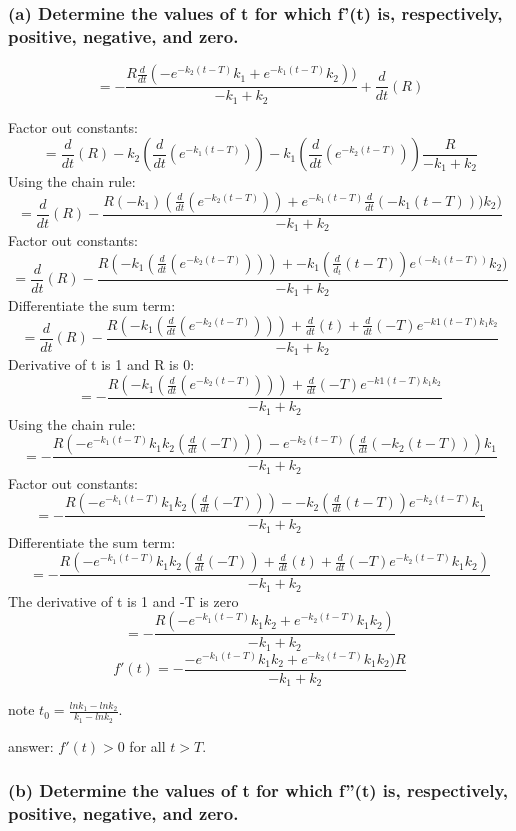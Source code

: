 \documentclass[]{article}
\begin{document}
\subsubsection{(a) Determine the values of t for which f'(t) is,
respectively, positive, negative, and
zero.}\label{a-determine-the-values-of-t-for-which-ft-is-respectively-positive-negative-and-zero.}

\[=- \frac{R \frac{d}{dt}(-e^{-k_2 (t-T)}k_1 + e^{-k_1(t - T)}k_2))}{-k_1 + k_2} + \frac{d}{dt}(R)\]

Factor out constants:
\[=\frac{d}{dt}(R) - k_2(\frac{d}{dt}(e^{-k_1(t - T)})) - k_1 (\frac{d}{dt}(e^{-k_2(t-T)})) \frac{R}{-k_1 + k_2}\]
Using the chain rule:
\[=\frac{d}{dt}(R)-\frac{R(-k_1)(\frac{d}{dt}(e^{-k_2(t-T)})) + e^{-k_1(t-T)}\frac{d}{dt}(-k_1(t-T)))k_2)}{-k_1+ k_2}\]
Factor out constants:
\[=\frac{d}{dt}(R) - \frac{R(-k_1(\frac{d}{dt}(e^{-k_2(t-T)})))+-k_1(\frac{d}{d_t}(t-T))e^(-k_1(t-T))k_2)}{-k_1 + k_2}\]
Differentiate the sum term:
\[=\frac{d}{dt}(R) - \frac{R(-k_1(\frac{d}{dt}(e^{-k_2(t-T)})))+ \frac{d}{dt}(t) + \frac{d}{dt}(-T)e^{-k1(t-T)k_1 k_2}}{-k_1 + k_2}\]
Derivative of t is 1 and R is 0:
\[=- \frac{R(-k_1(\frac{d}{dt}(e^{-k_2(t-T)})))+ \frac{d}{dt}(-T)e^{-k1(t-T)k_1 k_2}}{-k_1 + k_2}\]
Using the chain rule:
\[=-\frac{R(-e^{-k_1 (t-T)}k_1 k_2(\frac{d}{dt}(-T)))- e^{-k_2(t-T)}(\frac{d}{dt}(-k_2(t-T)))k_1}{-k_1 + k_2}\]
Factor out constants:
\[=-\frac{R(-e^{-k_1 (t-T)}k_1 k_2(\frac{d}{dt}(-T)))- -k_2(\frac{d}{dt}(t-T))e^{-k_2 (t-T)}k_1}{-k_1 + k_2}\]
Differentiate the sum term:
\[=-\frac{R(-e^{-k_1(t-T)}k_1 k_2(\frac{d}{dt}(-T)) + \frac{d}{dt}(t)+\frac{d}{dt}(-T)e^{-k_2(t-T)}k_1 k_2)}{-k_1 + k_2}\]
The derivative of t is 1 and -T is zero
\[=-\frac{R(-e^{-k_1(t-T)}k_1 k_2 + e^{-k_2(t-T)}k_1 k_2)}{-k_1 + k_2}\]
\[f'(t)=-\frac{-e^{-k_1 (t -T)}k_1 k_2 + e^{-k_2(t-T)}k_1 k_2)R}{-k_1 + k_2}\]

note \(t_0 = \frac{ln k_1 - ln k_2}{k_1 - lnk_2}\).

answer: \(f'(t) > 0\) for all \(t > T\).

\subsubsection{(b) Determine the values of t for which f''(t) is,
respectively, positive, negative, and
zero.}\label{b-determine-the-values-of-t-for-which-ft-is-respectively-positive-negative-and-zero.}
\end{document}

